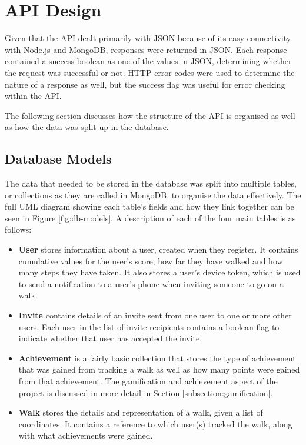
\section{API Design}


Given that the API dealt primarily with JSON because of its easy connectivity with Node.js and MongoDB, responses were returned in JSON. Each response contained a success boolean as one of the values in JSON, determining whether the request was successful or not. HTTP error codes were used to determine the nature of a response as well, but the success flag was useful for error checking within the API.

The following section discusses how the structure of the API is organised as well as how the data was split up in the database.


\subsection{Database Models}


The data that needed to be stored in the database was split into multiple tables, or collections as they are called in MongoDB, to organise the data effectively. The full UML diagram showing each table's fields and how they link together can be seen in Figure \ref{fig:db-models}. A description of each of the four main tables is as follows:

\begin{itemize}
  \item \textbf{User} stores information about a user, created when they register. It contains cumulative values for the user's score, how far they have walked and how many steps they have taken. It also stores a user's device token, which is used to send a notification to a user's phone when inviting someone to go on a walk.

  \item \textbf{Invite} contains details of an invite sent from one user to one or more other users. Each user in the list of invite recipients contains a boolean flag to indicate whether that user has accepted the invite.

  \item \textbf{Achievement} is a fairly basic collection that stores the type of achievement that was gained from tracking a walk as well as how many points were gained from that achievement. The gamification and achievement aspect of the project is discussed in more detail in Section \ref{subsection:gamification}.
 
  \item \textbf{Walk} stores the details and representation of a walk, given a list of coordinates. It contains a reference to which user(s) tracked the walk, along with what achievements were gained.
\end{itemize}

